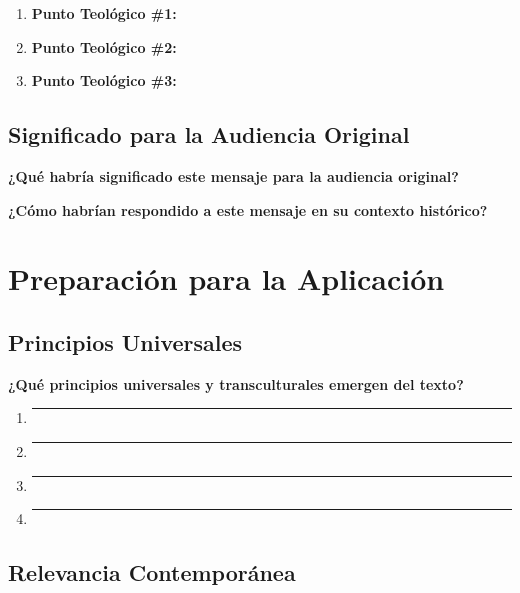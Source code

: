 \documentclass[11pt,a4paper]{article}
\begin{document}
\begin{enumerate}[leftmargin=1cm]
    \item \textbf{Punto Teológico \#1:}
    \vspace{2cm}
    
    \item \textbf{Punto Teológico \#2:}
    \vspace{2cm}
    
    \item \textbf{Punto Teológico \#3:}
    \vspace{2cm}
\end{enumerate}

\subsection{Significado para la Audiencia Original}

\textbf{¿Qué habría significado este mensaje para la audiencia original?}
\vspace{3cm}

\textbf{¿Cómo habrían respondido a este mensaje en su contexto histórico?}
\vspace{3cm}

\newpage

\section{Preparación para la Aplicación}

\subsection{Principios Universales}

\textbf{¿Qué principios universales y transculturales emergen del texto?}

\begin{enumerate}[leftmargin=1cm]
    \item \rule{12cm}{0.4pt}
    \vspace{0.8cm}
    \item \rule{12cm}{0.4pt}
    \vspace{0.8cm}
    \item \rule{12cm}{0.4pt}
    \vspace{0.8cm}
    \item \rule{12cm}{0.4pt}
    \vspace{0.8cm}
\end{enumerate}

\subsection{Relevancia Contemporánea}
\end{document}

